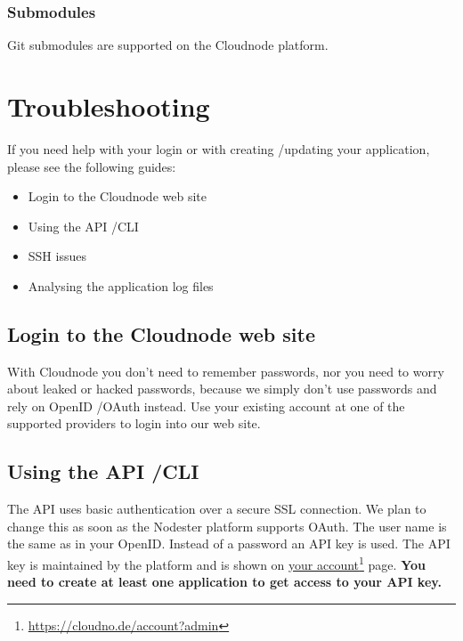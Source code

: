 \subsection{Submodules}
\label{submodules}

Git submodules are supported on the Cloudnode platform.

\chapter{Troubleshooting}
\label{troubleshooting}

If you need help with your login or with creating \slash  updating your application, please see the following guides:

\begin{itemize}
\item Login to the Cloudnode web site

\item Using the API \slash  CLI

\item SSH issues

\item Analysing the application log files

\end{itemize}



\section{Login to the Cloudnode web site}
\label{logintothecloudnodewebsite}

With Cloudnode you don't need to remember passwords, nor you need to worry about leaked or hacked passwords, because we simply don't use passwords and rely on OpenID \slash  OAuth instead. Use your existing account at one of the supported providers to login into our web site.



\section{Using the API \slash  CLI}
\label{usingtheapicli}

The API uses basic authentication over a secure SSL connection. We plan to change this as soon as the Nodester platform supports OAuth. The user name is the same as in your OpenID. Instead of a password an API key is used. The API key is maintained by the platform and is shown on \href{https://cloudno.de/account?admin}{your account}\footnote{\href{https://cloudno.de/account?admin}{https:/\slash cloudno.de\slash account?admin}} page. \textbf{You need to create at least one application to get access to your API key.}

